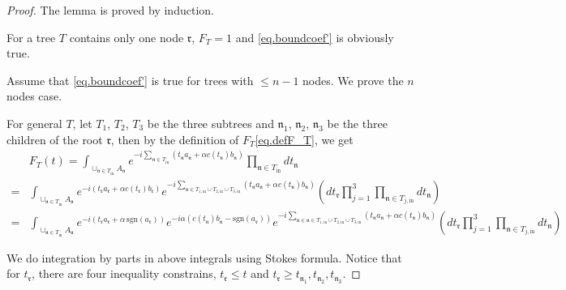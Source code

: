 \begin{proof} The lemma is proved by induction. 

For a tree $T$ contains only one node $\mathfrak{r}$, $F_{T}=1$ and \eqref{eq.boundcoef'} is obviously true.

Assume that \eqref{eq.boundcoef'} is true for trees with $\le n-1$ nodes. We prove the $n$ nodes case. 

For general $T$, let $T_1$, $T_2$, $T_3$ be the three subtrees and $\mathfrak{n}_1$, $\mathfrak{n}_2$, $\mathfrak{n}_3$ be the three children of the root $\mathfrak{r}$, then by the definition of $F_T$\eqref{eq.defF_T}, we get
\begin{equation}
\begin{split}
    &F_{T}(t)=\int_{\cup_{\mathfrak{n}\in T_{\text{in}}} A_{\mathfrak{n}}} e^{-i\sum_{\mathfrak{n}\in T_{\text{in}}} (t_{\mathfrak{n}}a_{\mathfrak{n}}+\alpha c(t_{\mathfrak{n}}) b_{\mathfrak{n}})} \prod_{\mathfrak{n}\in T_{\text{in}}} dt_{\mathfrak{n}}    
    \\
    =&\int_{\cup_{\mathfrak{n}\in T_{\text{in}}} A_{\mathfrak{n}}}e^{-i(t_{\mathfrak{r}}a_{\mathfrak{r}}+\alpha c(t_{\mathfrak{r}})b_{\mathfrak{r}})} e^{-i\sum_{\mathfrak{n}\in T_{1,\text{in}}\cup T_{2,\text{in}}\cup T_{3,\text{in}}} (t_{\mathfrak{n}}a_{\mathfrak{n}}+\alpha c(t_{\mathfrak{n}}) b_{\mathfrak{n}})}  \left(dt_{\mathfrak{r}}\prod_{j=1}^3\prod_{\mathfrak{n}\in T_{j,\text{in}}}dt_{\mathfrak{n}}  \right)
    \\
    =&\int_{\cup_{\mathfrak{n}\in T_{\text{in}}} A_{\mathfrak{n}}}e^{-i(t_{\mathfrak{r}}a_{\mathfrak{r}}+\alpha\, \text{sgn}(a_{\mathfrak{r}}))} e^{-i\alpha(c(t_{\mathfrak{n}}) b_{\mathfrak{n}}- \text{sgn}(a_{\mathfrak{r}}))} e^{-i\sum_{\mathfrak{n}\in \mathfrak{n}\in T_{1,\text{in}}\cup T_{2,\text{in}}\cup T_{3,\text{in}}} (t_{\mathfrak{n}}a_{\mathfrak{n}}+\alpha c(t_{\mathfrak{n}}) b_{\mathfrak{n}})}  \left(dt_{\mathfrak{r}}\prod_{j=1}^3\prod_{\mathfrak{n}\in T_{j,\text{in}}}dt_{\mathfrak{n}}  \right)
\end{split}
\end{equation}

We do integration by parts in above integrals using Stokes formula. Notice that for $t_{\mathfrak{r}}$, there are four inequality constrains, $t_{\mathfrak{r}}\le t$ and $t_{\mathfrak{r}}\ge t_{\mathfrak{n}_1},t_{\mathfrak{n}_2}, t_{\mathfrak{n}_3}$. 



\end{proof}
